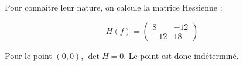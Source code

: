 \begin{solution}
\begin{enumerate}
        Pour connaître leur nature, on calcule la matrice Hessienne :

        \[ H(f) = \begin{pmatrix}
        8 & -12 \\
        -12 & 18
        \end{pmatrix}
        \]

        Pour le point $(0,0)$, $\det H = 0$. Le point est donc indéterminé. 
        
    \end{enumerate}
\end{solution}
